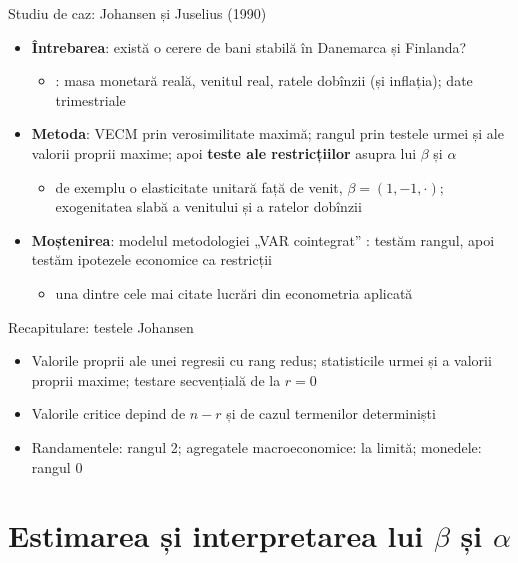 \begin{frame}{Studiu de caz: Johansen și Juselius (1990)}
\itemsize{\small}
\begin{itemize}
    \item \textbf{Întrebarea}: există o cerere de bani stabilă în Danemarca și Finlanda?
    \begin{itemize}
        \item {}: masa monetară reală, venitul real, ratele dobînzii (și inflația); date trimestriale
    \end{itemize}
    \item \textbf{Metoda}: VECM prin verosimilitate maximă; rangul prin testele urmei și ale valorii proprii maxime; apoi \textbf{teste ale restricțiilor} asupra lui $\beta$ și $\alpha$
    \begin{itemize}
        \item de exemplu o elasticitate unitară față de venit, $\beta = (1, -1, \cdot)$; exogenitatea slabă a venitului și a ratelor dobînzii
    \end{itemize}
    \item \textbf{Moștenirea}: modelul metodologiei „VAR cointegrat” : testăm rangul, apoi testăm ipotezele economice ca restricții
    \begin{itemize}
        \item una dintre cele mai citate lucrări din econometria aplicată
    \end{itemize}
\end{itemize}
\end{frame}

\begin{frame}{Recapitulare: testele Johansen}
\itemsize{\small}
\begin{itemize}
    \item Valorile proprii ale unei regresii cu rang redus; statisticile urmei și a valorii proprii maxime; testare secvențială de la $r = 0$
    \item Valorile critice depind de $n - r$ și de cazul termenilor determiniști
    \item Randamentele: rangul 2; agregatele macroeconomice: la limită; monedele: rangul 0
\end{itemize}
\end{frame}


\section{Estimarea și interpretarea lui $\beta$ și $\alpha$}


